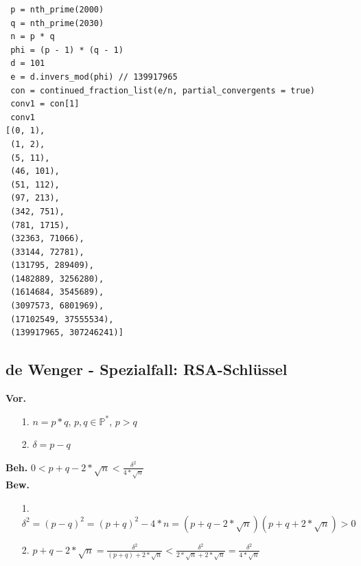 \documentclass[10pt]{article}
\newcommand{\PN}{\mathbb{P}} %
\newcommand{\Bold}[1]{\textbf{#1}} %
\begin{document}
\begin{lstlisting}
 p = nth_prime(2000)
 q = nth_prime(2030)
 n = p * q
 phi = (p - 1) * (q - 1)
 d = 101
 e = d.invers_mod(phi) // 139917965
 con = continued_fraction_list(e/n, partial_convergents = true)
 conv1 = con[1]
 conv1
[(0, 1),
 (1, 2),
 (5, 11),
 (46, 101),
 (51, 112),
 (97, 213),
 (342, 751),
 (781, 1715),
 (32363, 71066),                                                                              
 (33144, 72781),                                                                              
 (131795, 289409),                                                                            
 (1482889, 3256280),                                                                          
 (1614684, 3545689),
 (3097573, 6801969),
 (17102549, 37555534),
 (139917965, 307246241)]

\end{lstlisting}

\subsection{de Wenger - Spezialfall: RSA-Schlüssel}
\Bold{Vor.}
\begin{itemize}
	\item[1.] $n=p*q$, $p,q \in \PN^*$, $p>q$ 
	\item[2.] $\delta=p-q$
\end{itemize}
\Bold{Beh.} $0 < p+q - 2 * \sqrt{n} < \frac{\delta^2}{4 * \sqrt{n}}$ \\
\Bold{Bew.}
\begin{itemize}
	\item[1.] $\delta^2= (p-q)^2=(p+q)^2-4*n=(p+q-2*\sqrt{n})(p+q+2*\sqrt{n})>0$ 
	\item[2.] $p+q-2*\sqrt{n} = \frac{\delta^2}{(p+q)+2*\sqrt{n}} < \frac{\delta^2}{2*\sqrt{n}+2*\sqrt{n}}= \frac{\delta^2}{4 * \sqrt{n}}$
\end{itemize}


\newpage
\end{document}
